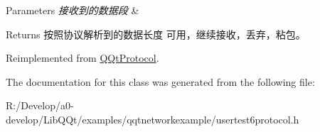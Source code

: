 \begin{DoxyParams}{Parameters}
{\em 接收到的数据段} & \\
\hline
\end{DoxyParams}
\begin{DoxyReturn}{Returns}
按照协议解析到的数据长度 可用，继续接收，丢弃，粘包。 
\end{DoxyReturn}


Reimplemented from \mbox{\hyperlink{class_q_qt_protocol_a00fd0c1ac23379ed3b9b25da9a34f39b}{Q\+Qt\+Protocol}}.



The documentation for this class was generated from the following file\+:\begin{DoxyCompactItemize}
\item 
R\+:/\+Develop/a0-\/develop/\+Lib\+Q\+Qt/examples/qqtnetworkexample/usertest6protocol.\+h\end{DoxyCompactItemize}
